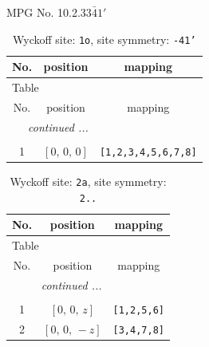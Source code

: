 \documentclass[fleqn,8pt]{jsarticle}
\begin{document}
\setcounter{MaxMatrixCols}{32}

\renewcommand{\tablename}{Table~}
\renewcommand{\figurename}{Figure~}
\begin{center}
\LARGE
MPG No. 10.2.33\quad$\bar{4}1'$
\end{center}
\renewcommand{\arraystretch}{1.2}
\begin{longtable}{ccc}
\caption{Wyckoff site: {\tt 1o}, site symmetry: {\tt -41'}}
 \\
 \hline \hline
No. & position & mapping \\ \hline \endfirsthead

\multicolumn{2}{l}{\tablename\ \thetable{}} \\
 \hline \hline
No. & position & mapping \\ \hline \endhead

 \hline \hline
\multicolumn{2}{r}{\footnotesize\it continued ...} \\ \endfoot

 \hline \hline
\multicolumn{2}{r}{} \\ \endlastfoot

1 & $\left[ 0,\, 0,\, 0 \right]$ & {\tt [1,2,3,4,5,6,7,8]} \\
\end{longtable}
\renewcommand{\arraystretch}{1.2}
\begin{longtable}{ccc}
\caption{Wyckoff site: {\tt 2a}, site symmetry: {\tt 2..}}
 \\
 \hline \hline
No. & position & mapping \\ \hline \endfirsthead

\multicolumn{2}{l}{\tablename\ \thetable{}} \\
 \hline \hline
No. & position & mapping \\ \hline \endhead

 \hline \hline
\multicolumn{2}{r}{\footnotesize\it continued ...} \\ \endfoot

 \hline \hline
\multicolumn{2}{r}{} \\ \endlastfoot

1 & $\left[ 0,\, 0,\, z \right]$ & {\tt [1,2,5,6]} \\ \hline
2 & $\left[ 0,\, 0,\, - z \right]$ & {\tt [3,4,7,8]} \\
\end{longtable}
\renewcommand{\arraystretch}{1.2}
\end{document}
